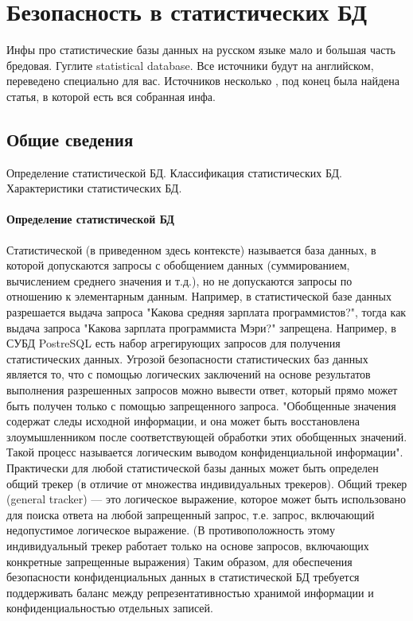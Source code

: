 \section{Безопасность в статистических БД}

Инфы про статистические базы данных на русском языке мало и большая часть бредовая. Гуглите statistical database. Все источники будут на английском, переведено специально для вас. Источников несколько \cite{ComputerSecurity2008} \cite{IntroBD2014}, под конец была найдена статья, \cite{SDB1989} в которой есть вся собранная инфа.

\subsection{Общие сведения}
Определение статистической БД. Классификация статистических БД. Характеристики статистических БД.

\paragraph{Определение статистической БД}
Статистической (в приведенном здесь контексте) называется база данных, в которой допускаются запросы с обобщением данных (суммированием, вычислением среднего значения и т.д.), но не допускаются запросы по отношению к элементарным данным. Например, в статистической базе данных разрешается выдача запроса "Какова средняя зарплата программистов?", тогда как выдача запроса "Какова зарплата программиста Мэри?" запрещена. Например, в СУБД PostreSQL есть набор агрегирующих запросов для получения статистических данных. 
Угрозой безопасности статистических баз данных является то, что с помощью логических заключений на основе результатов выполнения разрешенных запросов можно вывести ответ, который прямо может быть получен только с помощью запрещенного запроса. "Обобщенные значения содержат следы исходной информации, и она может быть восстановлена злоумышленником после соответствующей обработки этих обобщенных значений. Такой процесс называется логическим выводом конфиденциальной информации".
Практически для любой статистической базы данных может быть определен общий трекер (в отличие от множества индивидуальных трекеров). Общий трекер (general tracker) — это логическое выражение, которое может быть использовано для поиска ответа на любой запрещенный запрос, т.е. запрос, включающий недопустимое логическое выражение. (В противоположность этому индивидуальный трекер работает только на основе запросов, включающих конкретные запрещенные выражения)
Таким образом, для обеспечения безопасности конфиденциальных данных в статистической БД требуется поддерживать баланс между репрезентативностью хранимой информации и конфиденциальностью отдельных записей.

